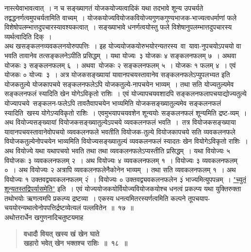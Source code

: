 \documentclass[11pt, openany]{book}
\begin{document}
\newpage

\begin{sloppypar}
\noindent नास्त्येवाभावत्वात्~। न च सङ्ख्यागतं योजकयोज्यत्वादिकं यथा तदभावे शून्य उपचर्यते तद्वद्धनर्णत्वमुपचर्यतामिति वाच्यम्~। योजकयोज्यवियोजकवियोज्यगुणकगुण्यभाजक-भाज्यत्वधर्माणां फले विशेषोपलम्भात्तदुपचारस्यावश्यकत्वात्~। सङ्ख्याभावे धनर्णत्वयोस्तु फले विशेषानुपलम्भात्तदुपचारस्य व्यर्थत्वादिति दिक्~।\\

अथ खसङ्कलनव्यवकलनयोरुपपत्तिः~। इह योज्ययोजकयोरुभयोरन्यतरस्य~वा~यावा-नुपचयोऽपचयो वा भवति तावानेव तत्सङ्कलनेऽपीति प्रसिद्धम्~। यथा योज्यः~३ योजकः ४ सङ्कलनफलम् ७~। अथवा योजकः ३ सङ्कलनफलम् ६~। अथवा~योजकः २ सङ्कलनफलम् ५~। योजकः १ फलम् ४~। एवं योजकः ० योज्यः~३~। अत्र योजकसङ्ख्यायां यावानपचयस्तावानेव सङ्कलनफलेऽप्युपलभ्यत इति योजकतुल्ये योजकापचये सङ्कलनफलेऽपि योजकतुल्ये-नापचयेन भाव्यम्~। तथा सति योज्यतुल्यमेव सङ्कलनफलं स्यादिति खेन योगेऽविकृतो राशिः~। एवं योज्यापचयवशादपि सङ्कलनफलापचयाद्योज्यतुल्ये योज्यापचये~सङ्कलन-फलेऽपि तावतैवापचयेन भाव्यमिति योजकसङ्ख्यातुल्यमेव सङ्कलनफलं स्यादिति~खस्य योगेऽप्यविकृतो राशिः~। एवमुभयापचयवशेन शून्ययोः सङ्कलनफलं शून्यमिति द्रष्ट-व्यम्~। अथ वियोज्यसङ्ख्यायां वियोजकसङ्ख्यातुल्येऽपचये व्यवकलनफलं भवति~।~तत्र वियोजकसङ्ख्याया यावानपचयस्तावानेवोपचयो व्यवकलनफले भवतीति वियोजक-तुल्ये वियोजकापचये सति व्यवकलनफले वियोजकतुल्येनोपचयेन भाव्यमिति वियोज्यसङ्ख्यातुल्यं व्यवकलनफलं स्यादतः खेन वियोगेऽविकृतो राशिः~। अथ वियोज्ये यथा यथापचयो भवति तथा तथा व्यवकलनफलेऽप्यस्तीति प्रसिद्धम्~। यथा वियोज्यः ५ वियोजकः ३ व्यवकलनफलम् २~। अथ वियोज्यः ४ व्यवकलनफलम् १~। वियोज्यः ३ व्यवकलनफलम् ०~। अथ वियोज्यः २ अत्रापि व्यवकलनफलेनैकोनेन भाव्यम्~। तथा सति व्यवकलनफलम् १~। अथ वियोज्यः १ उक्तवद्व्यवकलनफलम् २ं~। वियोज्यः ० उक्तवद्व्यवकलनफलेन ३ं भाज्यमित्युपपन्नम्~। \hyperref[2.16]{"च्युतं शून्यतस्तद्विपर्यासमेति"} इति~। एवं योज्ययोजकयोर्वियोज्यवियोजकयोश्च धनत्वं प्रकल्प्य यथा युक्तिरुक्ता तथोभयोः ऋणत्वमपि प्रकल्प्य द्रष्टव्या~। एकस्य धनत्वमितरस्यर्णत्वमिति कल्पने तूपचयाप-चययोरन्यथात्वेनोपपत्तिर्द्रष्टव्येत्यलं पल्लवितेन~॥~१७~॥\\

{\small अथोत्तरार्धेन खगुणनादिचतुष्टयमाह\textendash }

 \label{2.18}
\begin{quote}
{\large \textbf{{\color{purple}वधादौ वियत् खस्य खं खेन घाते \\
खहारो भवेत् खेन भक्तश्च राशिः~॥~१८~॥}}}
\end{quote}
\end{sloppypar}

\newpage
\end{document}

